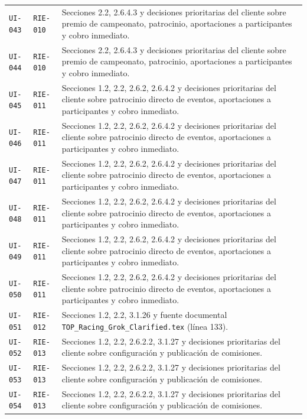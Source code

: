 \documentclass[10pt,letterpaper]{article}
\begin{document}
\begin{landscape}
\begin{longtable}{P{2.7cm}P{2.6cm}P{15.7cm}}
\texttt{UI-043} & \texttt{RIE-010} & Secciones 2.2, 2.6.4.3 y decisiones prioritarias del cliente sobre premio de campeonato, patrocinio, aportaciones a participantes y cobro inmediato.\\
\texttt{UI-044} & \texttt{RIE-010} & Secciones 2.2, 2.6.4.3 y decisiones prioritarias del cliente sobre premio de campeonato, patrocinio, aportaciones a participantes y cobro inmediato.\\
\texttt{UI-045} & \texttt{RIE-011} & Secciones 1.2, 2.2, 2.6.2, 2.6.4.2 y decisiones prioritarias del cliente sobre patrocinio directo de eventos, aportaciones a participantes y cobro inmediato.\\
\texttt{UI-046} & \texttt{RIE-011} & Secciones 1.2, 2.2, 2.6.2, 2.6.4.2 y decisiones prioritarias del cliente sobre patrocinio directo de eventos, aportaciones a participantes y cobro inmediato.\\
\texttt{UI-047} & \texttt{RIE-011} & Secciones 1.2, 2.2, 2.6.2, 2.6.4.2 y decisiones prioritarias del cliente sobre patrocinio directo de eventos, aportaciones a participantes y cobro inmediato.\\
\texttt{UI-048} & \texttt{RIE-011} & Secciones 1.2, 2.2, 2.6.2, 2.6.4.2 y decisiones prioritarias del cliente sobre patrocinio directo de eventos, aportaciones a participantes y cobro inmediato.\\
\texttt{UI-049} & \texttt{RIE-011} & Secciones 1.2, 2.2, 2.6.2, 2.6.4.2 y decisiones prioritarias del cliente sobre patrocinio directo de eventos, aportaciones a participantes y cobro inmediato.\\
\texttt{UI-050} & \texttt{RIE-011} & Secciones 1.2, 2.2, 2.6.2, 2.6.4.2 y decisiones prioritarias del cliente sobre patrocinio directo de eventos, aportaciones a participantes y cobro inmediato.\\
\texttt{UI-051} & \texttt{RIE-012} & Secciones 1.2, 2.2, 3.1.26 y fuente documental \texttt{TOP\_Racing\_Grok\_Clarified.tex} (línea 133).\\
\texttt{UI-052} & \texttt{RIE-013} & Secciones 1.2, 2.2, 2.6.2.2, 3.1.27 y decisiones prioritarias del cliente sobre configuración y publicación de comisiones.\\
\texttt{UI-053} & \texttt{RIE-013} & Secciones 1.2, 2.2, 2.6.2.2, 3.1.27 y decisiones prioritarias del cliente sobre configuración y publicación de comisiones.\\
\texttt{UI-054} & \texttt{RIE-013} & Secciones 1.2, 2.2, 2.6.2.2, 3.1.27 y decisiones prioritarias del cliente sobre configuración y publicación de comisiones.\\

\end{longtable}
\end{landscape}
\end{document}

